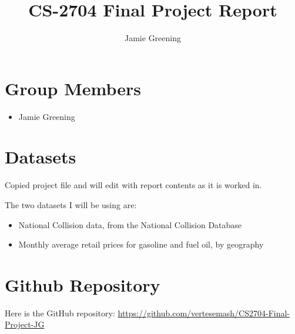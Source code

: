 \documentclass[runningheads]{llncs}
\begin{document}
%
\title{CS-2704 Final Project Report}
%
%
\author{Jamie Greening}
%
%
%
\maketitle              %
%

%
%
%
\section{Group Members}
\begin{itemize}
    \item Jamie Greening
\end{itemize}

\section{Datasets}
Copied project file and will edit with report contents as it is worked in.

The two datasets I will be using are:
\begin{itemize}
    \item National Collision data, from the National Collision Database \cite{ref_url1}
    \item Monthly average retail prices for gasoline and fuel oil, by geography \cite{ref_url2}
\end{itemize}

\section{Github Repository}
Here is the GitHub repository: \url{https://github.com/vertesemash/CS2704-Final-Project-JG}
\end{document}
